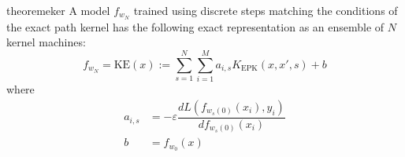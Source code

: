 
\begin{restatable}{theorem}{eker}
\label{thm:eker}
A model $f_{w_N}$ trained using discrete steps matching the conditions of the exact path kernel has the following exact representation as an ensemble of $N$ kernel machines:
\begin{equation}
f_{w_N} = \text{KE}(x) :=  \sum_{s = 1}^N \sum_{i = 1}^{M} a_{i,s} K_{\text{EPK}}(x, x', s) + b
\label{ensemble}
\end{equation}
where
\begin{align}
a_{i, s} &= -\varepsilon  \dfrac{d L(f_{w_s(0)}(x_i),  y_i)}{d f_{w_s(0)}(x_i)} \\
b &= f_{w_0}(x)
\end{align}
\end{restatable}

